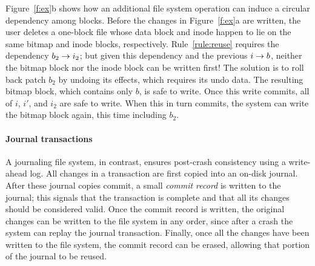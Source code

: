 \begin{comment}
\begin{figure}[htb]
  \centering
  \texttt{[image: fig/examplesb\_3]}
  \caption{\label{fig:softupdate} Soft updates \patches\
  for appending one block to an empty file in an FFS-like file system.}
\end{figure}
\end{comment}

Figure~\ref{f:ex}b shows how an additional file system operation can induce
 a circular dependency among blocks.
%
Before the changes in Figure~\ref{f:ex}a are written, the user deletes a
 one-block file whose data block and inode happen to lie on the same bitmap
 and inode blocks, respectively.
%
Rule~\ref{rule:reuse} requires the dependency $b_2 \rightarrow i_2$; but
 given this dependency and the previous $i \rightarrow b$, neither the bitmap
 block nor the inode block can be written first!
%
The solution is to roll back patch $b_2$ by undoing its effects, which
 requires its undo data.  The resulting bitmap block, which contains only
 $b$, is safe to write.  Once this write commits, all of $i$, $i'$, and
 $i_2$ are safe to write.  When this in turn commits, the system can write
 the bitmap block again, this time including $b_2$.


\paragraph{Journal transactions}
%
A journaling file system, in contrast, ensures post-crash consistency using
 a write-ahead log.
%
%
All changes in a transaction are first copied into an on-disk journal.
%
After these journal copies commit, a small \emph{commit record} is written
 to the journal; this signals that the transaction is complete and that all
 its changes should be considered valid.
%
Once the commit record is written, the original changes can be written to the
file system in any order, since after a crash the system can replay the
 journal transaction.
%
Finally, once all the changes have been written to the file system, the commit
record can be erased, allowing that portion of the journal to be reused.

\begin{comment}
\begin{figure}[htb]
  \centering
  \texttt{[image: fig/examplesb\_2]}
  \caption{\label{fig:journal} An example journal transaction using \patches.}
\end{figure}
\end{comment}

